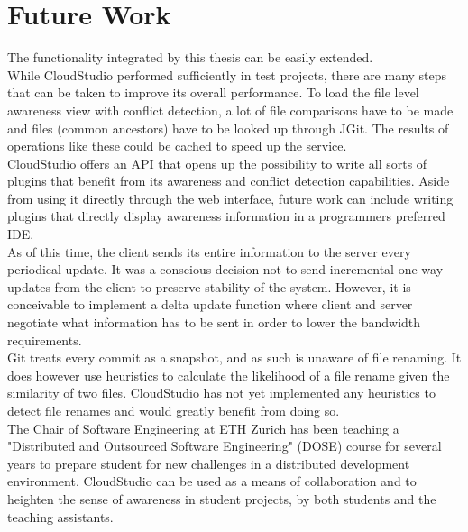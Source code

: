 

\chapter{Future Work}\label{futurework}

The functionality integrated by this thesis can be easily extended. \\

While CloudStudio performed sufficiently in test projects, there are many steps that can be taken to improve its overall performance. To load the file level awareness view with conflict detection, a lot of file comparisons have to be made and files (common ancestors) have to be looked up through JGit. The results of operations like these could be cached to speed up the service. \\

CloudStudio offers an API that opens up the possibility to write all sorts of plugins that benefit from its awareness and conflict detection capabilities. Aside from using it directly through the web interface, future work can include writing plugins that directly display awareness information in a programmers preferred IDE. \\

As of this time, the client sends its entire information to the server every periodical update. It was a conscious decision not to send incremental one-way updates from the client to preserve stability of the system. However, it is conceivable to implement a delta update function where client and server negotiate what information has to be sent in order to lower the bandwidth requirements. \\

Git treats every commit as a snapshot, and as such is unaware of file renaming. It does however use heuristics to calculate the likelihood of a file rename given the similarity of two files. CloudStudio has not yet implemented any heuristics to detect file renames and would greatly benefit from doing so. \\

The Chair of Software Engineering at ETH Zurich has been teaching a "Distributed and Outsourced Software Engineering" (DOSE) course for several years to prepare student for new challenges in a distributed development environment. \cite{ref19, ref20} CloudStudio can be used as a means of collaboration and to heighten the sense of awareness in student projects, by both students and the teaching assistants.



